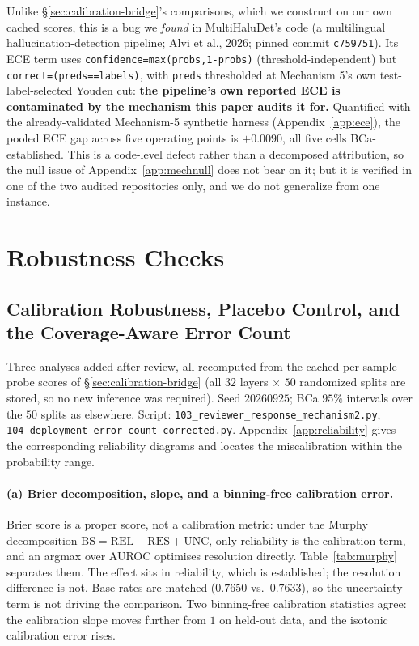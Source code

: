 \documentclass{article}
\begin{document}
Unlike \S\ref{sec:calibration-bridge}'s comparisons, which we construct on our
own cached scores, this is a bug we \emph{found} in MultiHaluDet's code (a
multilingual hallucination-detection pipeline; Alvi et al., 2026; pinned
commit \texttt{c759751}). Its ECE term uses
\texttt{confidence=max(probs,1-probs)} (threshold-independent) but
\texttt{correct=(preds==labels)}, with \texttt{preds} thresholded at Mechanism
5's own test-label-selected Youden cut: \textbf{the pipeline's own reported
ECE is contaminated by the mechanism this paper audits it for.} Quantified
with the already-validated Mechanism-5 synthetic harness
(Appendix~\ref{app:ece}), the pooled ECE gap across five operating points is
$+0.0090$, all five cells BCa-established. This is a code-level defect rather
than a decomposed attribution, so the null issue of
Appendix~\ref{app:mechnull} does not bear on it; but it is verified in one of
the two audited repositories only, and we do not generalize from one instance.

\section{Robustness Checks}

\subsection{Calibration Robustness, Placebo Control, and the Coverage-Aware Error Count}
\label{app:reviewer-response}

Three analyses added after review, all recomputed from the cached per-sample
probe scores of \S\ref{sec:calibration-bridge} (all $32$ layers $\times$ $50$
randomized splits are stored, so no new inference was required). Seed
$20260925$; BCa $95\%$ intervals over the $50$ splits as elsewhere.
Script: \texttt{103\_reviewer\_response\_mechanism2.py},
\texttt{104\_deployment\_error\_count\_corrected.py}.
Appendix~\ref{app:reliability} gives the corresponding reliability diagrams and
locates the miscalibration within the probability range.

\paragraph{(a) Brier decomposition, slope, and a binning-free calibration
error.} Brier score is a proper score, not a calibration metric: under the
Murphy decomposition $\mathrm{BS}=\mathrm{REL}-\mathrm{RES}+\mathrm{UNC}$, only
reliability is the calibration term, and an argmax over AUROC optimises
resolution directly. Table~\ref{tab:murphy} separates them. The effect sits in
reliability, which is established; the resolution difference is not. Base rates
are matched ($0.7650$ vs.\ $0.7633$), so the uncertainty term is not driving
the comparison. Two binning-free calibration statistics agree: the calibration
slope moves further from $1$ on held-out data, and the isotonic calibration
error rises.
\end{document}

